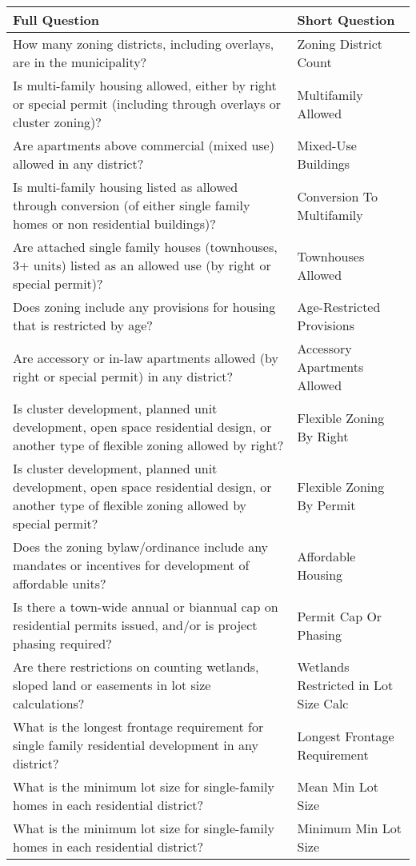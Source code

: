 \begin{tabular}{p{16cm}p{6cm}}
\toprule
Full Question & Short Question \\
\midrule
How many zoning districts, including overlays, are in the municipality? & Zoning District Count \\
Is multi-family housing allowed, either by right or special permit (including through overlays or cluster zoning)? & Multifamily Allowed \\
Are apartments above commercial (mixed use) allowed in any district? & Mixed-Use Buildings \\
Is multi-family housing listed as allowed through conversion (of either single family homes or non residential buildings)? & Conversion To Multifamily \\
Are attached single family houses (townhouses, 3+ units) listed as an allowed use (by right or special permit)? & Townhouses Allowed \\
Does zoning include any provisions for housing that is restricted by age? & Age-Restricted Provisions \\
Are accessory or in-law apartments allowed (by right or special permit) in any district? & Accessory Apartments Allowed \\
Is cluster development, planned unit development, open space residential design, or another type of flexible zoning allowed by right? & Flexible Zoning By Right \\
Is cluster development, planned unit development, open space residential design, or another type of flexible zoning allowed by special permit? & Flexible Zoning By Permit \\
Does the zoning bylaw/ordinance include any mandates or incentives for development of affordable units? & Affordable Housing \\
Is there a town-wide annual or biannual cap on residential permits issued, and/or is project phasing required? & Permit Cap Or Phasing \\
Are there restrictions on counting wetlands, sloped land or easements in lot size calculations? & Wetlands Restricted in Lot Size Calc \\
What is the longest frontage requirement for single family residential development in any district? & Longest Frontage Requirement \\
What is the minimum lot size for single-family homes in each residential district? & Mean Min Lot Size \\
What is the minimum lot size for single-family homes in each residential district? & Minimum Min Lot Size \\

\end{tabular}
